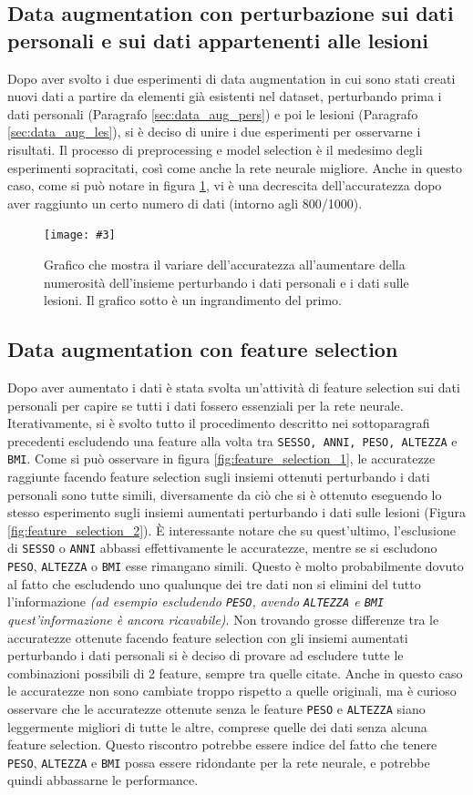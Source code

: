 \documentclass[12pt, twoside, letterpaper]{report}
\newcommand{\img}[4] {
	\begin{figure}
		\centering
		\texttt{[image: \#3]}\\
		\caption{#1}
		\label{fig:#4}
	\end{figure}
}
\begin{document}
		\subsection{Data augmentation con perturbazione sui dati personali e sui dati appartenenti alle lesioni}
			Dopo aver svolto i due esperimenti di data augmentation in cui sono stati creati nuovi dati a partire da elementi già esistenti nel dataset, perturbando prima i dati personali (Paragrafo \ref{sec:data_aug_pers}) e poi le lesioni (Paragrafo \ref{sec:data_aug_les}), si è deciso di unire i due esperimenti per osservarne i risultati. Il processo di preprocessing e model selection è il medesimo degli esperimenti sopracitati, così come anche la rete neurale migliore. Anche in questo caso, come si può notare in figura \ref{fig:acc_data_aug_both}, vi è una decrescita dell'accuratezza dopo aver raggiunto un certo numero di dati (intorno agli 800/1000).
			\img{Grafico che mostra il variare dell'accuratezza all'aumentare della numerosità dell'insieme perturbando i dati personali e i dati sulle lesioni. Il grafico sotto è un ingrandimento del primo.}{0.35}{acc_data_aug_both_.png}{acc_data_aug_both}
			
		\subsection{Data augmentation con feature selection} Dopo aver aumentato i dati è stata svolta un'attività di feature selection sui dati personali per capire se tutti i dati fossero essenziali per la rete neurale. Iterativamente, si è svolto tutto il procedimento descritto nei sottoparagrafi precedenti escludendo una feature alla volta tra \texttt{SESSO, ANNI, PESO, ALTEZZA} e \texttt{BMI}. Come si può osservare in figura \ref{fig:feature_selection_1}, le accuratezze raggiunte facendo feature selection sugli insiemi ottenuti perturbando i dati personali sono tutte simili, diversamente da ciò che si è ottenuto eseguendo lo stesso esperimento sugli insiemi aumentati perturbando i dati sulle lesioni (Figura \ref{fig:feature_selection_2}). È interessante notare che su quest'ultimo, l'esclusione di \texttt{SESSO} o \texttt{ANNI} abbassi effettivamente le accuratezze, mentre se si escludono \texttt{PESO}, \texttt{ALTEZZA} o \texttt{BMI} esse rimangano simili. Questo è molto probabilmente dovuto al fatto che escludendo uno qualunque dei tre dati non si elimini del tutto l'informazione \textit{(ad esempio escludendo \texttt{PESO}, avendo \texttt{ALTEZZA} e \texttt{BMI} quest'informazione è ancora ricavabile)}. Non trovando grosse differenze tra le accuratezze ottenute facendo feature selection con gli insiemi aumentati perturbando i dati personali si è deciso di provare ad escludere tutte le combinazioni possibili di 2 feature, sempre tra quelle citate. Anche in questo caso le accuratezze non sono cambiate troppo rispetto a quelle originali, ma è curioso osservare che le accuratezze ottenute senza le feature \texttt{PESO} e \texttt{ALTEZZA} siano leggermente migliori di tutte le altre, comprese quelle dei dati senza alcuna feature selection. Questo riscontro potrebbe essere indice del fatto che tenere \texttt{PESO}, \texttt{ALTEZZA} e \texttt{BMI} possa essere ridondante per la rete neurale, e potrebbe quindi abbassarne le performance. 
\end{document}
